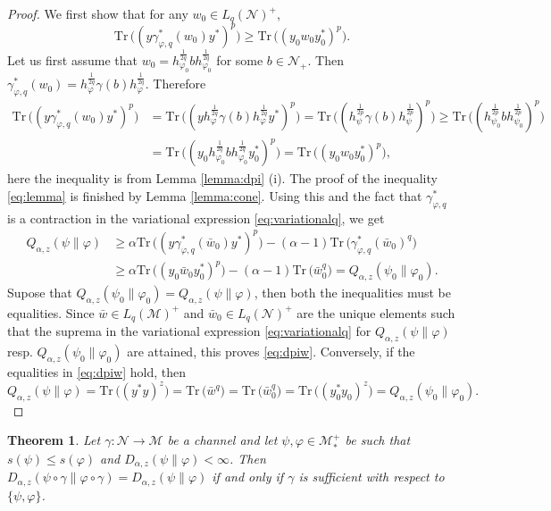 \documentclass[12pt]{article}
\newtheorem{theorem}{Theorem}[section]
\theoremstyle{definition}
\theoremstyle{remark}
\numberwithin{equation}{section}
\def\Me{\mathcal M}
\def\Ne{\mathcal N}
\def \Tr{\mathrm{Tr}\,}
\def\ffi{\varphi}
\begin{document}
\begin{proof} We first show that  for any $w_0\in L_q(\Ne)^+$,
\begin{equation}\label{eq:lemma}
\Tr\bigl((y\gamma^*_{\ffi,q}(w_0)y^*)^p\bigr)\ge
\Tr \bigl((y_0w_0y_0^*)^p\bigr).
\end{equation}
Let us first assume that
$w_0=h_{\varphi_0}^{\frac1{2q}}bh_{\varphi_0}^{\frac1{2q}}$ for some $b\in \Ne_+$. Then 
$\gamma^*_{\varphi,q}(w_0)=h_{\varphi}^{\frac1{2q}}\gamma(b)h_{\varphi}^{\frac1{2q}}$.
Therefore
\begin{align*}
\Tr\bigl((y\gamma^*_{\varphi,q}(w_0)y^*)^p\bigr)&=\Tr\bigl((yh_{\varphi}^{\frac1{2q}}\gamma(b)h_{\varphi}^{\frac1{2q}}y^*)^p\bigr)=
\Tr\bigl((h_\psi^{\frac1{2p}}\gamma(b)h_\psi^{\frac1{2p}})^p\bigr)\ge
\Tr\bigl((h_{\psi_0}^{\frac1{2p}}bh_{\psi_0}^{\frac1{2p}})^p\bigr)\\
&=
\Tr\bigl((y_0h_{\varphi_0}^{\frac1{2q}}bh_{\varphi_0}^{\frac1{2q}}y_0^*)^p\bigr)=\Tr\bigl((y_0w_0y_0^*)^p\bigr),
\end{align*}
here the inequality is from Lemma \ref{lemma:dpi} (i). The proof of the inequality
\eqref{eq:lemma} is  finished  by Lemma \ref{lemma:cone}.
Using this and the fact that $\gamma^*_{\ffi,q}$ is a contraction in the variational expression \eqref{eq:variationalq}, we get
\begin{align*}
Q_{\alpha,z}(\psi\|\varphi)&\ge \alpha\Tr\bigl((y\gamma^*_{\varphi,q}(\bar
w_0)y^*)^p\bigr)-(\alpha-1)\Tr
\bigl(\gamma^*_{\varphi,q}(\bar w_0)^q\bigr)\\
&\ge \alpha\Tr\bigr((y_0\bar w_0 y_0^*)^p\bigr)-(\alpha-1)\Tr \bigl(\bar
w_0^q\bigr)=Q_{\alpha,z}(\psi_0\|\varphi_0).
\end{align*}
Supose that $Q_{\alpha,z}(\psi_0\|\varphi_0)=Q_{\alpha,z}(\psi\|\varphi)$, then both the
inequalities must be equalities. Since $\bar
w\in L_q(\Me)^+$ and $\bar w_0\in L_q(\Ne)^+$ are the unique elements such that the suprema
in the variational expression \eqref{eq:variationalq} for $Q_{\alpha,z}(\psi\|\varphi)$ resp.
$Q_{\alpha,z}(\psi_0\|\varphi_0)$ are attained, this proves \eqref{eq:dpiw}. Conversely,
if the equalities in \eqref{eq:dpiw} hold, then
\[
Q_{\alpha,z}(\psi\|\ffi)=\Tr \bigl((y^*y)^z\bigr)=\Tr\bigl(\bar
w^q\bigr)=\Tr\bigl(\bar w_0^q\bigr)=\Tr \bigl((y_0^*y_0)^z\bigr)=Q_{\alpha,z}(\psi_0\|\ffi_0).
\]



\end{proof}


\begin{theorem}\label{thm:suffge1} Let $\gamma:\Ne\to \Me$ be a channel and let $\psi,\varphi\in \Me_*^+$ be
such that 
$s(\psi)\le s(\ffi)$ and 
$D_{\alpha,z}(\psi\|\varphi)<\infty$. Then
$D_{\alpha,z}(\psi\circ\gamma\|\ffi\circ\gamma)=D_{\alpha,z}(\psi\|\varphi)$ if and only if
$\gamma$ is sufficient with respect to $\{\psi,\ffi\}$.

\end{theorem}
\end{document}
